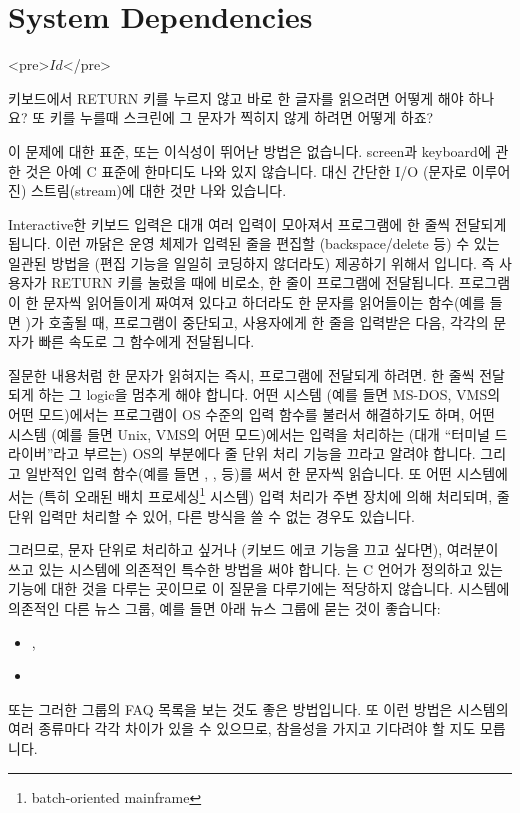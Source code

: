 \chapter{System Dependencies}	\label{chap:sysdep}

\begin{rawhtml}
<pre>$Id$</pre>
\end{rawhtml}

\begin{faq}
	키보드에서 RETURN 키를 누르지 않고 바로 한 글자를 읽으려면
	어떻게 해야 하나요? 또 키를 누를때 스크린에 그 문자가 찍히지
	않게 하려면 어떻게 하죠?

\A
	이 문제에 대한 표준, 또는 이식성이 뛰어난 방법은 없습니다.
	screen과 keyboard에 관한 것은 아예 C 표준에 한마디도
	나와 있지 않습니다.  대신 간단한 I/O (문자로 이루어진) 스트림(stream)에
	대한 것만 나와 있습니다.

	Interactive한 키보드 입력은 대개 여러 입력이 모아져서 프로그램에
	한 줄씩 전달되게 됩니다.  이런 까닭은 운영 체제가 입력된 줄을
	편집할 (backspace/delete 등) 수 있는 일관된 방법을 
	(편집 기능을 일일히 코딩하지 않더라도) 제공하기	위해서 입니다.  
	즉 사용자가 RETURN 키를 눌렀을 때에 비로소, 한 줄이 프로그램에
	전달됩니다.  프로그램이 한 문자씩 읽어들이게 짜여져 있다고 하더라도
	한 문자를 읽어들이는 함수(예를 들면 )가 호출될 때,
	프로그램이 중단되고,
	사용자에게 한 줄을 입력받은 다음, 각각의 문자가 빠른 속도로
	그 함수에게 전달됩니다.

	질문한 내용처럼 한 문자가 읽혀지는 즉시, 프로그램에 전달되게 하려면.
	한 줄씩 전달되게 하는 그 logic을 멈추게 해야 합니다.
	어떤 시스템 (예를 들면 MS-DOS, VMS의 어떤 모드)에서는
	프로그램이 OS 수준의 입력 함수를 불러서 해결하기도 하며,
	어떤 시스템 (예를 들면 Unix, VMS의 어떤 모드)에서는
	입력을 처리하는 (대개 ``터미널 드라이버''라고 부르는) OS의
	부분에다 줄 단위 처리 기능을 끄라고 알려야 합니다.
	그리고 일반적인 입력 함수(예를 들면 , , 등)를
	써서 한 문자씩 읽습니다.
	또 어떤 시스템에서는 (특히 오래된 배치
	프로세싱\footnote{batch-oriented mainframe} 시스템) 입력 처리가
	주변 장치에 의해 처리되며, 줄 단위 입력만 처리할 수 있어, 다른
	방식을 쓸 수 없는 경우도 있습니다.

	그러므로, 문자 단위로 처리하고 싶거나 (키보드 에코 기능을 끄고
	싶다면), 여러분이 쓰고 있는 시스템에 의존적인 특수한 방법을
	써야 합니다.  는 C 언어가 정의하고 있는
	기능에 대한 것을 다루는 곳이므로 이 질문을 다루기에는
	적당하지 않습니다.  시스템에 의존적인 다른 뉴스 그룹, 예를
	들면 아래 뉴스 그룹에 묻는 것이 좋습니다:
        \begin{itemize}
          \item {},
          \item {}
        \end{itemize}
	\noindent 또는 그러한 그룹의 FAQ 목록을 보는 것도
	좋은 방법입니다.  또 이런 방법은 시스템의 여러 종류마다 각각 차이가
	있을 수 있으므로, 참을성을 가지고 기다려야 할 지도 모릅니다.


\end{faq}
